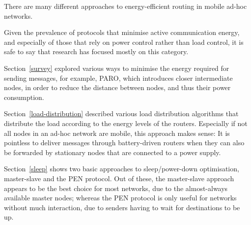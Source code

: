 There are many different approaches to energy-efficient routing in
mobile ad-hoc networks.

Given the prevalence of protocols that minimise active communication energy,
and especially of those that rely on power control rather than load control, it
is safe to say that research has focused mostly on this category.

Section~\ref{survey} explored various ways to minimise the energy required for sending
messages, for example, PARO, which introduces closer intermediate nodes,
in order to reduce the distance between nodes, and thus their
power consumption.

Section~\ref{load-distribution} described various load distribution algorithms that distribute
the load according to the energy levels of the routers. Especially if not all
nodes in an ad-hoc network are mobile, this approach makes sense: It is
pointless to deliver messages through battery-driven routers when they can
also be forwarded by stationary nodes that are connected to a power supply.

Section~\ref{sleep} shows two basic approaches to sleep/power-down optimisation, master-slave
and the PEN protocol. Out of these, the master-slave approach appears to be the
best choice for most networks, due to the almost-always available master nodes;
whereas the PEN protocol is only useful for networks without much interaction,
due to senders having to wait for destinations to be up.
